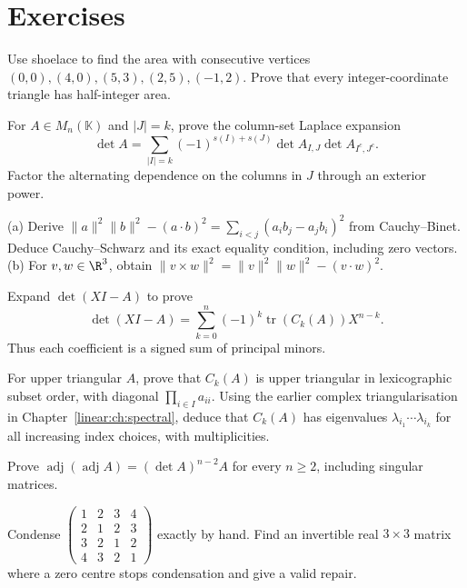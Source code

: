 \section{Exercises}
\begin{exercise}[$\star$]\label{linear:ex:latticetriangle}
Use shoelace to find the area with consecutive vertices $(0,0),(4,0),(5,3),(2,5),(-1,2)$. Prove that every integer-coordinate triangle has half-integer area.
\end{exercise}
\begin{exercise}[$\star$]\label{linear:ex:laplace}
For $A\in M_n(\mathbb K)$ and $|J|=k$, prove the column-set Laplace expansion
\[\det A=\sum_{|I|=k}(-1)^{s(I)+s(J)}\det A_{I,J}\det A_{I^c,J^c}.\]
Factor the alternating dependence on the columns in $J$ through an exterior power.
\end{exercise}
\begin{exercise}[$\star\star$]\label{linear:ex:lagrangeid}
(a) Derive $\|a\|^2\|b\|^2-(a\cdot b)^2=\sum_{i<j}(a_ib_j-a_jb_i)^2$ from Cauchy--Binet. Deduce Cauchy--Schwarz and its exact equality condition, including zero vectors. (b) For $v,w\in\R^3$, obtain $\|v\times w\|^2=\|v\|^2\|w\|^2-(v\cdot w)^2$.
\end{exercise}
\begin{exercise}[$\star\star$]\label{linear:ex:charpoly}
Expand $\det(XI-A)$ to prove
\[\det(XI-A)=\sum_{k=0}^n(-1)^k\operatorname{tr}(C_k(A))X^{n-k}.\]
Thus each coefficient is a signed sum of principal minors.
\end{exercise}
\begin{exercise}[$\star$]\label{linear:ex:compoundeig}
For upper triangular $A$, prove that $C_k(A)$ is upper triangular in lexicographic subset order, with diagonal $\prod_{i\in I}a_{ii}$. Using the earlier complex triangularisation in Chapter~\ref{linear:ch:spectral}, deduce that $C_k(A)$ has eigenvalues $\lambda_{i_1}\cdots\lambda_{i_k}$ for all increasing index choices, with multiplicities.
\end{exercise}
\begin{exercise}[$\star\star$]\label{linear:ex:adjadj}
Prove $\operatorname{adj}(\operatorname{adj}A)=(\det A)^{n-2}A$ for every $n\ge2$, including singular matrices.
\end{exercise}
\begin{exercise}[$\star$]\label{linear:ex:dodgson}
Condense $\begin{pmatrix}1&2&3&4\\2&1&2&3\\3&2&1&2\\4&3&2&1\end{pmatrix}$ exactly by hand. Find an invertible real $3\times3$ matrix where a zero centre stops condensation and give a valid repair.
\end{exercise}
